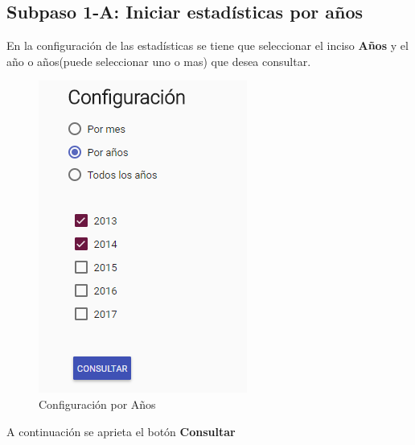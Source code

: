 \subsection{Subpaso 1-A: Iniciar estadísticas por años}
	En la configuración de las estadísticas se tiene que seleccionar el 
	inciso \textbf{Años} y el año o años(puede seleccionar uno o mas) que desea 
	consultar.
		
	\begin{figure}[hbtp]

	\includegraphics[scale=0.5]{images/Interfaz/IUGS15_configuracioAnos.PNG}
	\caption{Configuración por Años }
	\end{figure}
	A continuación se aprieta el botón \textbf{Consultar}
	
